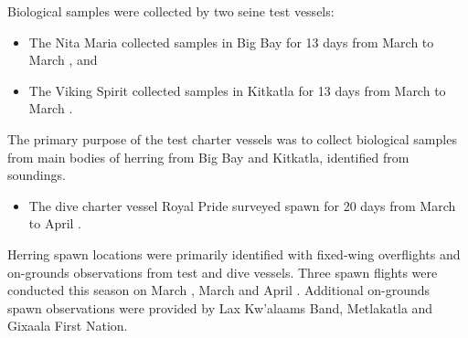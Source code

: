 Biological samples were collected by two seine test vessels:

\begin{itemize}

\item The Nita Maria collected samples in Big Bay
for 13 days from March  to March , and 

\item The Viking Spirit collected samples in Kitkatla
for 13 days from March  to March .

\end{itemize}

The primary purpose of the test charter vessels was to
collect biological samples from main bodies of herring
from Big Bay and Kitkatla, identified from soundings.

\begin{itemize}

\item The dive charter vessel Royal Pride surveyed spawn
for 20 days from March  to April .

\end{itemize}

Herring spawn locations were primarily identified with
fixed-wing overflights and on-grounds observations from test and dive vessels.
Three spawn flights were conducted this season
on March , March  and April .
Additional on-grounds spawn observations were provided by
Lax Kw'alaams Band, Metlakatla and Gixaala First Nation.
